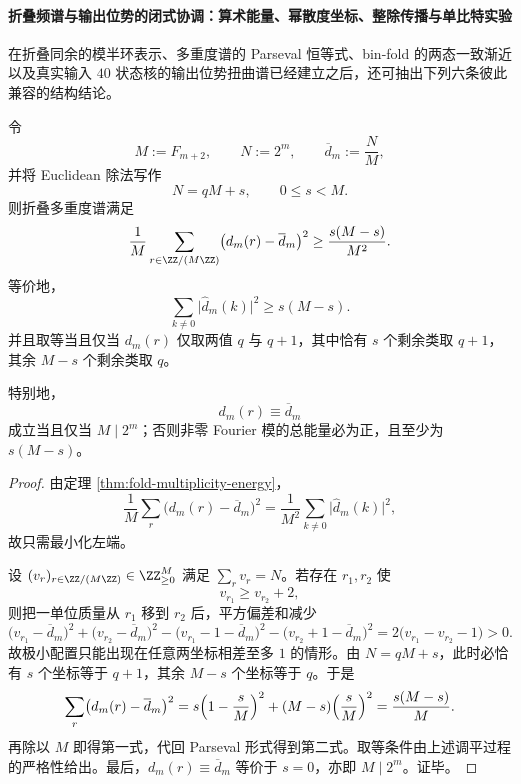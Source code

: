 \paragraph{折叠频谱与输出位势的闭式协调：算术能量、幂散度坐标、整除传播与单比特实验}
在折叠同余的模半环表示、多重度谱的 Parseval 恒等式、bin-fold 的两态一致渐近以及真实输入 \(40\) 状态核的输出位势扭曲谱已经建立之后，还可抽出下列六条彼此兼容的结构结论。

\begin{conclusion}\label{con:xi-time-part9l-fold-fourier-energy-arithmetic-lower-bound}
令
\[
M:=F_{m+2},\qquad N:=2^m,\qquad \overline d_m:=\frac{N}{M},
\]
并将 Euclidean 除法写作
\[
N=qM+s,\qquad 0\le s<M.
\]
则折叠多重度谱满足
\[
\frac{1}{M}\sum_{r\in\ZZ/(M\ZZ)}\bigl(d_m(r)-\overline d_m\bigr)^2
\ge
\frac{s(M-s)}{M^2}.
\]
等价地，
\[
\sum_{k\ne 0}\bigl|\widehat d_m(k)\bigr|^2\ge s(M-s).
\]
并且取等当且仅当 \(d_m(r)\) 仅取两值 \(q\) 与 \(q+1\)，其中恰有 \(s\) 个剩余类取 \(q+1\)，其余 \(M-s\) 个剩余类取 \(q\)。

特别地，
\[
d_m(r)\equiv \overline d_m
\]
成立当且仅当 \(M\mid 2^m\)；否则非零 Fourier 模的总能量必为正，且至少为 \(s(M-s)\)。
\end{conclusion}
\begin{proof}
由定理 \ref{thm:fold-multiplicity-energy}，
\[
\frac{1}{M}\sum_r\bigl(d_m(r)-\overline d_m\bigr)^2
=
\frac{1}{M^2}\sum_{k\ne 0}\bigl|\widehat d_m(k)\bigr|^2,
\]
故只需最小化左端。

设 \((v_r)_{r\in\ZZ/(M\ZZ)}\in\ZZ_{\ge 0}^{M}\) 满足 \(\sum_r v_r=N\)。若存在 \(r_1,r_2\) 使
\[
v_{r_1}\ge v_{r_2}+2,
\]
则把一单位质量从 \(r_1\) 移到 \(r_2\) 后，平方偏差和减少
\[
\bigl(v_{r_1}-\overline d_m\bigr)^2+\bigl(v_{r_2}-\overline d_m\bigr)^2
-\bigl(v_{r_1}-1-\overline d_m\bigr)^2
-\bigl(v_{r_2}+1-\overline d_m\bigr)^2
=2\bigl(v_{r_1}-v_{r_2}-1\bigr)>0.
\]
故极小配置只能出现在任意两坐标相差至多 \(1\) 的情形。由 \(N=qM+s\)，此时必恰有 \(s\) 个坐标等于 \(q+1\)，其余 \(M-s\) 个坐标等于 \(q\)。于是
\[
\sum_r\bigl(d_m(r)-\overline d_m\bigr)^2
=
s\Bigl(1-\frac{s}{M}\Bigr)^2+(M-s)\Bigl(\frac{s}{M}\Bigr)^2
=
\frac{s(M-s)}{M}.
\]
再除以 \(M\) 即得第一式，代回 Parseval 形式得到第二式。取等条件由上述调平过程的严格性给出。最后，\(d_m(r)\equiv \overline d_m\) 等价于 \(s=0\)，亦即 \(M\mid 2^m\)。证毕。
\end{proof}

